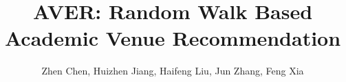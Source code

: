 \documentclass{sig-alternate-2013}
\begin{document}
\title{AVER: Random Walk Based Academic Venue Recommendation}

\author{
\alignauthor
Zhen Chen, Huizhen Jiang, Haifeng Liu, Jun Zhang, Feng Xia\\
       \\
}
\end{document}
